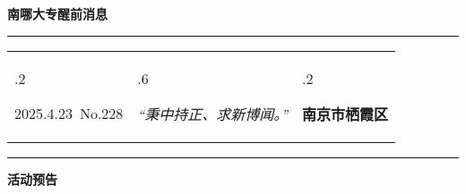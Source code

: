 \documentclass[letterpaper, 12pt]{article}
\begin{document}
\begin{center}
    \Huge\textbf{南哪大专醒前消息}
\end{center}
\vspace{4mm}
\hrule
\renewcommand\tabularxcolumn[1]{m{#1}}
\begin{tabularx}{\textwidth}{>{\hsize.2\hsize}X>{\hsize.6\hsize}X>{\hsize.2\hsize}X}
    \begin{flushleft}
        2025.4.23\, No.228
    \end{flushleft}
    &
    \begin{center}
        \textit{“秉中持正、求新博闻。”}
    \end{center}
    &
    \begin{flushright}
        \textbf{南京市栖霞区}
    \end{flushright}
\end{tabularx}
\vspace{-3.5mm}
\hrule
\vspace{4mm}
\centerline{\huge\textbf{活动预告}}
\end{document}
